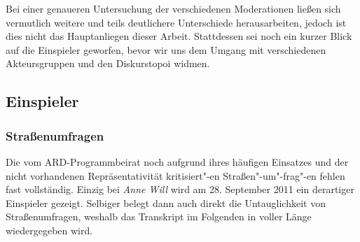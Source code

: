 Bei einer genaueren Untersuchung der verschiedenen Moderationen ließen sich vermutlich weitere und teils deutlichere Unterschiede herausarbeiten, jedoch ist dies nicht das Hauptanliegen dieser Arbeit. Stattdessen sei noch ein kurzer Blick auf die Einspieler geworfen, bevor wir uns dem Umgang mit verschiedenen Akteursgruppen und den Diskurstopoi widmen.

\subsection{Einspieler}

\subsubsection{Straßenumfragen}

Die vom ARD-Programmbeirat noch aufgrund ihres häufigen Einsatzes und der nicht vorhandenen Repräsentativität kritisiert"-en Straßen"-um"-frag"-en \parencite[4]{ard-programmbeiratTalkformateImErsten2012} fehlen fast vollständig. Einzig bei \textit{Anne Will} wird am 28. September 2011 ein derartiger Einspieler gezeigt. Selbiger belegt dann auch direkt die Untauglichkeit von Straßenumfragen, weshalb das Transkript im Folgenden in voller Länge wiedergegeben wird.

